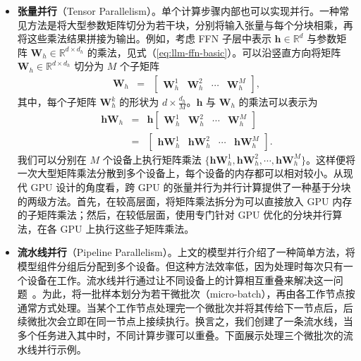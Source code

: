 \begin{itemize}
\item \vspace{0.3em} \textbf{张量并行}（Tensor Parallelism）。单个计算步骤内部也可以实现并行。一种常见方法是将大型参数矩阵切分为若干块，分别将输入张量与每个分块相乘，再将这些乘法结果拼接为输出。例如，考虑 FFN 子层中表示 $\mathbf{h} \in \mathbb{R}^{d}$ 与参数矩阵 $\mathbf{W}_h \in \mathbb{R}^{d \times d_h}$ 的乘法，见式（\ref{eq:llm-ffn-basic}）。可以沿竖直方向将矩阵 $\mathbf{W}_h \in \mathbb{R}^{d \times d_h}$ 切分为 $M$ 个子矩阵
    \begin{eqnarray}
    \mathbf{W}_h & = & \begin{bmatrix} \mathbf{W}_h^{1} & \mathbf{W}_h^{2} & \cdots & \mathbf{W}_h^{M} \end{bmatrix},
    \end{eqnarray}
    \noindent 其中，每个子矩阵 $\mathbf{W}_h^{k}$ 的形状为 $d \times \frac{d_h}{M}$。$\mathbf{h}$ 与 $\mathbf{W}_h$ 的乘法可以表示为
    \begin{eqnarray}
    \mathbf{h} \mathbf{W}_h & = & \mathbf{h} \begin{bmatrix} \mathbf{W}_h^{1} & \mathbf{W}_h^{2} & \cdots & \mathbf{W}_h^{M} \end{bmatrix} \nonumber \\
                            & = & \begin{bmatrix} \mathbf{h} \mathbf{W}_h^{1} & \mathbf{h} \mathbf{W}_h^{2} & \cdots & \mathbf{h} \mathbf{W}_h^{M} \end{bmatrix}.
    \end{eqnarray}
    \noindent 我们可以分别在 $M$ 个设备上执行矩阵乘法 $\{\mathbf{h} \mathbf{W}_h^{1}, \mathbf{h} \mathbf{W}_h^{2}, \cdots ,\mathbf{h} \mathbf{W}_h^{M} \}$。这样便将一次大型矩阵乘法分散到多个设备上，每个设备的内存都可以相对较小。从现代 GPU 设计的角度看，跨 GPU 的张量并行为并行计算提供了一种基于分块的两级方法。首先，在较高层面，将矩阵乘法拆分为可以直接放入 GPU 内存的子矩阵乘法；然后，在较低层面，使用专门针对 GPU 优化的分块并行算法，在各 GPU 上执行这些子矩阵乘法。

\item \vspace{0.3em} \textbf{流水线并行}（Pipeline Parallelism）。上文的模型并行介绍了一种简单方法，将模型组件分组后分配到多个设备。但这种方法效率低，因为处理时每次只有一个设备在工作。流水线并行通过让不同设备上的计算相互重叠来解决这一问题~\cite{harlap-etal:2018pipedream,huang-etal:2019gpipe}。为此，将一批样本划分为若干微批次（micro-batch），再由各工作节点按通常方式处理。当某个工作节点处理完一个微批次并将其传给下一节点后，后续微批次会立即在同一节点上接续执行。换言之，我们创建了一条流水线，当多个任务进入其中时，不同计算步骤可以重叠。下面展示处理三个微批次的流水线并行示例。
\end{itemize}

